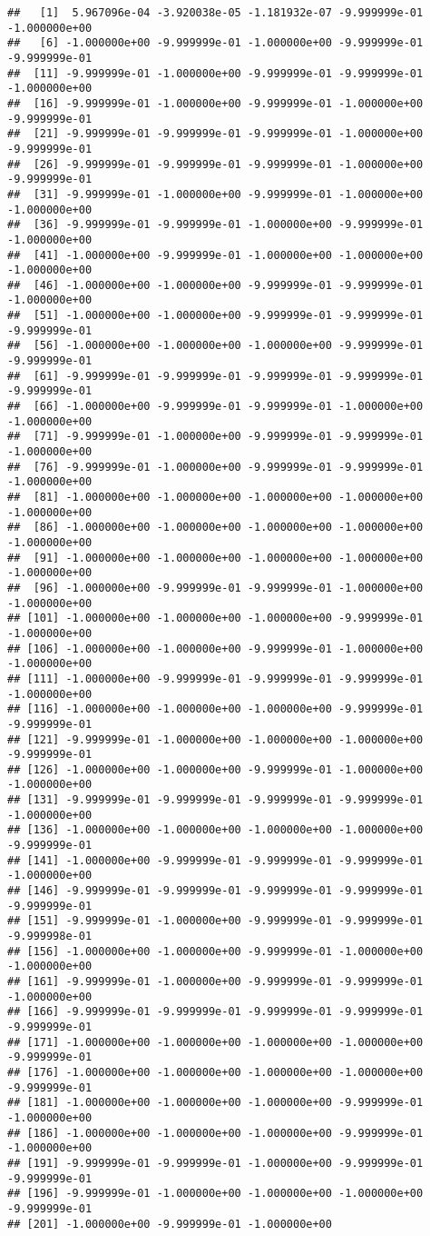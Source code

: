 \documentclass[
]{article}
\begin{document}
\begin{verbatim}
##   [1]  5.967096e-04 -3.920038e-05 -1.181932e-07 -9.999999e-01 -1.000000e+00
##   [6] -1.000000e+00 -9.999999e-01 -1.000000e+00 -9.999999e-01 -9.999999e-01
##  [11] -9.999999e-01 -1.000000e+00 -9.999999e-01 -9.999999e-01 -1.000000e+00
##  [16] -9.999999e-01 -1.000000e+00 -9.999999e-01 -1.000000e+00 -9.999999e-01
##  [21] -9.999999e-01 -9.999999e-01 -9.999999e-01 -1.000000e+00 -9.999999e-01
##  [26] -9.999999e-01 -9.999999e-01 -9.999999e-01 -1.000000e+00 -9.999999e-01
##  [31] -9.999999e-01 -1.000000e+00 -9.999999e-01 -1.000000e+00 -1.000000e+00
##  [36] -9.999999e-01 -9.999999e-01 -1.000000e+00 -9.999999e-01 -1.000000e+00
##  [41] -1.000000e+00 -9.999999e-01 -1.000000e+00 -1.000000e+00 -1.000000e+00
##  [46] -1.000000e+00 -1.000000e+00 -9.999999e-01 -9.999999e-01 -1.000000e+00
##  [51] -1.000000e+00 -1.000000e+00 -9.999999e-01 -9.999999e-01 -9.999999e-01
##  [56] -1.000000e+00 -1.000000e+00 -1.000000e+00 -9.999999e-01 -9.999999e-01
##  [61] -9.999999e-01 -9.999999e-01 -9.999999e-01 -9.999999e-01 -9.999999e-01
##  [66] -1.000000e+00 -9.999999e-01 -9.999999e-01 -1.000000e+00 -1.000000e+00
##  [71] -9.999999e-01 -1.000000e+00 -9.999999e-01 -9.999999e-01 -1.000000e+00
##  [76] -9.999999e-01 -1.000000e+00 -9.999999e-01 -9.999999e-01 -1.000000e+00
##  [81] -1.000000e+00 -1.000000e+00 -1.000000e+00 -1.000000e+00 -1.000000e+00
##  [86] -1.000000e+00 -1.000000e+00 -1.000000e+00 -1.000000e+00 -1.000000e+00
##  [91] -1.000000e+00 -1.000000e+00 -1.000000e+00 -1.000000e+00 -1.000000e+00
##  [96] -1.000000e+00 -9.999999e-01 -9.999999e-01 -1.000000e+00 -1.000000e+00
## [101] -1.000000e+00 -1.000000e+00 -1.000000e+00 -9.999999e-01 -1.000000e+00
## [106] -1.000000e+00 -1.000000e+00 -9.999999e-01 -1.000000e+00 -1.000000e+00
## [111] -1.000000e+00 -9.999999e-01 -9.999999e-01 -9.999999e-01 -1.000000e+00
## [116] -1.000000e+00 -1.000000e+00 -1.000000e+00 -9.999999e-01 -9.999999e-01
## [121] -9.999999e-01 -1.000000e+00 -1.000000e+00 -1.000000e+00 -9.999999e-01
## [126] -1.000000e+00 -1.000000e+00 -9.999999e-01 -1.000000e+00 -1.000000e+00
## [131] -9.999999e-01 -9.999999e-01 -9.999999e-01 -9.999999e-01 -1.000000e+00
## [136] -1.000000e+00 -1.000000e+00 -1.000000e+00 -1.000000e+00 -9.999999e-01
## [141] -1.000000e+00 -9.999999e-01 -9.999999e-01 -9.999999e-01 -1.000000e+00
## [146] -9.999999e-01 -9.999999e-01 -9.999999e-01 -9.999999e-01 -9.999999e-01
## [151] -9.999999e-01 -1.000000e+00 -9.999999e-01 -9.999999e-01 -9.999998e-01
## [156] -1.000000e+00 -1.000000e+00 -9.999999e-01 -1.000000e+00 -1.000000e+00
## [161] -9.999999e-01 -1.000000e+00 -9.999999e-01 -9.999999e-01 -1.000000e+00
## [166] -9.999999e-01 -9.999999e-01 -9.999999e-01 -9.999999e-01 -9.999999e-01
## [171] -1.000000e+00 -1.000000e+00 -1.000000e+00 -1.000000e+00 -9.999999e-01
## [176] -1.000000e+00 -1.000000e+00 -1.000000e+00 -1.000000e+00 -9.999999e-01
## [181] -1.000000e+00 -1.000000e+00 -1.000000e+00 -9.999999e-01 -1.000000e+00
## [186] -1.000000e+00 -1.000000e+00 -1.000000e+00 -9.999999e-01 -1.000000e+00
## [191] -9.999999e-01 -9.999999e-01 -1.000000e+00 -9.999999e-01 -9.999999e-01
## [196] -9.999999e-01 -1.000000e+00 -1.000000e+00 -1.000000e+00 -9.999999e-01
## [201] -1.000000e+00 -9.999999e-01 -1.000000e+00
\end{verbatim}
\end{document}
